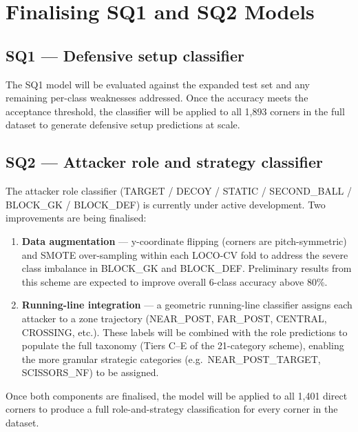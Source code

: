 \section{Finalising SQ1 and SQ2 Models}
\label{sec:plan_models}

\subsection*{SQ1 — Defensive setup classifier}

The SQ1 model will be evaluated against the expanded test set and any
remaining per-class weaknesses addressed. Once the accuracy meets the
acceptance threshold, the classifier will be applied to all 1{,}893
corners in the full dataset to generate defensive setup predictions at
scale.

\subsection*{SQ2 — Attacker role and strategy classifier}

The attacker role classifier (TARGET / DECOY / STATIC / SECOND\_BALL /
BLOCK\_GK / BLOCK\_DEF) is currently under active development. Two
improvements are being finalised:
\begin{enumerate}
  \item \textbf{Data augmentation} — y-coordinate flipping (corners
        are pitch-symmetric) and SMOTE over-sampling within each
        LOCO-CV fold to address the severe class imbalance in
        BLOCK\_GK and BLOCK\_DEF. Preliminary results from this scheme
        are expected to improve overall 6-class accuracy above 80\%.
  \item \textbf{Running-line integration} — a geometric running-line
        classifier assigns each attacker to a zone trajectory
        (NEAR\_POST, FAR\_POST, CENTRAL, CROSSING, etc.). These labels
        will be combined with the role predictions to populate the
        full taxonomy (Tiers C--E of the 21-category scheme), enabling
        the more granular strategic categories (e.g.\ NEAR\_POST\_TARGET,
        SCISSORS\_NF) to be assigned.
\end{enumerate}

Once both components are finalised, the model will be applied to all
1{,}401 direct corners to produce a full role-and-strategy classification
for every corner in the dataset.

